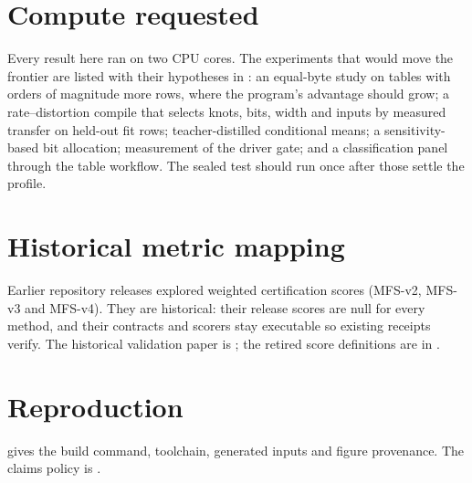\documentclass{article}
\begin{document}
\section{Compute requested}
\label{app:compute}
Every result here ran on two CPU cores. The experiments that would move the frontier are listed with their
hypotheses in : an equal-byte study on tables with orders of magnitude more rows, where
the program's advantage should grow; a rate--distortion compile that selects knots, bits, width and inputs by
measured transfer on held-out fit rows; teacher-distilled conditional means; a sensitivity-based bit
allocation; measurement of the driver gate; and a classification panel through the table workflow. The
sealed test should run once after those settle the profile.

\section{Historical metric mapping}
\label{app:history}
Earlier repository releases explored weighted certification scores (MFS-v2, MFS-v3 and
MFS-v4). They are historical: their release scores are null for every method, and their
contracts and scorers stay executable so existing receipts verify. The historical validation
paper is ; the retired score definitions are in
.

\section{Reproduction}
\label{app:repro}
 gives the build command, toolchain, generated inputs and figure
provenance. The claims policy is .


\nocite{esteban2017rcgan}

\end{document}
